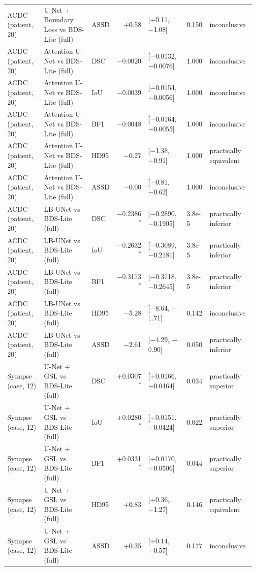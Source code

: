 \begin{tabular}{lllrlll}
ACDC (patient, 20) & U-Net + Boundary Loss vs BDS-Lite (full) & ASSD & +0.58 & [+0.11, +1.08] & 0.150 & inconclusive \\
ACDC (patient, 20) & Attention U-Net vs BDS-Lite (full) & DSC & $-$0.0020 & [$-$0.0132, +0.0076] & 1.000 & inconclusive \\
ACDC (patient, 20) & Attention U-Net vs BDS-Lite (full) & IoU & $-$0.0039 & [$-$0.0154, +0.0056] & 1.000 & inconclusive \\
ACDC (patient, 20) & Attention U-Net vs BDS-Lite (full) & BF1 & $-$0.0048 & [$-$0.0164, +0.0055] & 1.000 & inconclusive \\
ACDC (patient, 20) & Attention U-Net vs BDS-Lite (full) & HD95 & $-$0.27 & [$-$1.38, +0.91] & 1.000 & practically equivalent \\
ACDC (patient, 20) & Attention U-Net vs BDS-Lite (full) & ASSD & $-$0.00 & [$-$0.81, +0.62] & 1.000 & inconclusive \\
ACDC (patient, 20) & LB-UNet vs BDS-Lite (full) & DSC & $-$0.2386$^{*}$ & [$-$0.2890, $-$0.1905] & 3.8e-5 & practically inferior \\
ACDC (patient, 20) & LB-UNet vs BDS-Lite (full) & IoU & $-$0.2632$^{*}$ & [$-$0.3089, $-$0.2181] & 3.8e-5 & practically inferior \\
ACDC (patient, 20) & LB-UNet vs BDS-Lite (full) & BF1 & $-$0.3173$^{*}$ & [$-$0.3718, $-$0.2645] & 3.8e-5 & practically inferior \\
ACDC (patient, 20) & LB-UNet vs BDS-Lite (full) & HD95 & $-$5.28 & [$-$8.64, $-$1.71] & 0.142 & inconclusive \\
ACDC (patient, 20) & LB-UNet vs BDS-Lite (full) & ASSD & $-$2.61 & [$-$4.29, $-$0.90] & 0.050 & practically inferior \\
\midrule
Synapse (case, 12) & U-Net + GSL vs BDS-Lite (full) & DSC & +0.0307$^{*}$ & [+0.0166, +0.0464] & 0.034 & practically superior \\
Synapse (case, 12) & U-Net + GSL vs BDS-Lite (full) & IoU & +0.0280$^{*}$ & [+0.0151, +0.0424] & 0.022 & practically superior \\
Synapse (case, 12) & U-Net + GSL vs BDS-Lite (full) & BF1 & +0.0331$^{*}$ & [+0.0170, +0.0506] & 0.044 & practically superior \\
Synapse (case, 12) & U-Net + GSL vs BDS-Lite (full) & HD95 & +0.83 & [+0.36, +1.27] & 0.146 & practically equivalent \\
Synapse (case, 12) & U-Net + GSL vs BDS-Lite (full) & ASSD & +0.35 & [+0.14, +0.57] & 0.177 & inconclusive \\

\end{tabular}
